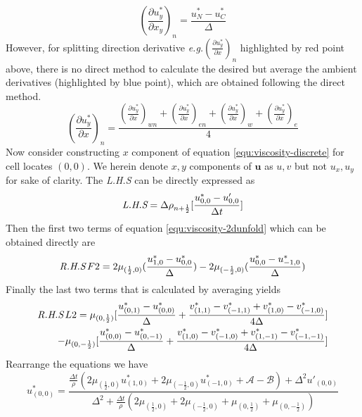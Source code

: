 \begin{equation}
  (\frac{\partial u^*_y}{\partial x_y})_n = \frac{u^*_N-u^*_C}{\Delta}
\end{equation}
However, for splitting direction derivative \emph{e.g.}$(\frac{\partial u^*_y}{\partial x})_n$ highlighted by red point above, there is no direct method to calculate the desired but average the ambient derivatives (highlighted by blue point), which are obtained following the direct method.
\begin{equation}
  (\frac{\partial u^*_y}{\partial x})_n = \frac{ ( \frac{\partial u^*_y}{\partial x})_{wn}+( \frac{\partial u^*_y}{\partial x})_{en}+( \frac{\partial u^*_y}{\partial x})_{w}+( \frac{\partial u^*_y}{\partial x})_{e}}{4}
\end{equation}
Now consider constructing $x$ component of equation \ref{equ:viscosity-discrete} for cell locates $(0,0)$. We herein denote $x,y$ components of $ \mathbf{u}$ as $u,v$ but not $u_x,u_y$ for sake of clarity. The \emph{L.H.S} can be directly expressed as 
\begin{equation}
  \emph{L.H.S}=\Delta\rho_{n+ \frac{1}{2}}[ \frac{u^*_{0,0}-u'_{0,0}}{\Delta t}]
\end{equation}
Then the first two terms of equation \ref{equ:viscosity-2dunfold} which can be obtained directly are
\begin{equation}
  \emph{R.H.S}\,F2 =  2\mu_{(\frac{1}{2},0)}(\frac{u^*_{1,0}-u^*_{0,0}}{\Delta})-2\mu_{(-\frac{1}{2},0)}(\frac{u^*_{0,0}-u^*_{-1,0}}{\Delta})
\end{equation}
Finally the last two terms that is calculated by averaging yields
\begin{equation}
\begin{aligned}
  \emph{R.H.S}\,L2 = 
    \mu_{(0,\frac{1}{2})}[\frac{u^*_{(0,1)}-u^*_{(0,0)}}{\Delta}
    +\frac{v^*_{(1,1)}-v^*_{(-1,1)}+v^*_{(1,0)}-v^*_{(-1,0)}}{4\Delta}]\\-\mu_{(0,-\frac{1}{2})}[\frac{u^*_{(0,0)}-u^*_{(0,-1)}}{\Delta}+\frac{v^*_{(1,0)}-v^*_{(-1,0)}+v^*_{(1,-1)}-v^*_{(-1,-1)}}{4\Delta}]
\end{aligned}
\end{equation}
Rearrange the equations we have
\begin{equation}\label{equ:viscosity-aim}
    u^*_{(0,0)} = \frac{\frac{\Delta t}{\rho}(2\mu_{(\frac{1}{2},0)}u^*_{(1,0)}+2\mu_{(-\frac{1}{2},0)}u^*_{(-1,0)}+\mathscr{A}-\mathscr{B})+\Delta^2 u'_{(0,0)}}{\Delta^2+\frac{\Delta t}{\rho}(2\mu_{(\frac{1}{2},0)}+2\mu_{(-\frac{1}{2},0)}+\mu_{(0,\frac{1}{2})}+\mu_{(0,-\frac{1}{2})})}
\end{equation}

